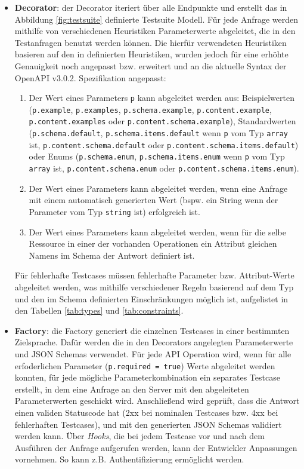 \begin{itemize}
	\item \textbf{Decorator}: der Decorator iteriert über alle Endpunkte und erstellt das in Abbildung \ref{fig:testsuite} definierte Testsuite Modell. Für jede Anfrage werden mithilfe von verschiedenen Heuristiken Parameterwerte abgeleitet, die in den Testanfragen benutzt werden können. Die hierfür verwendeten Heuristiken basieren auf den in \textcite{ed2018automatic} definierten Heuristiken, wurden jedoch für eine erhöhte Genauigkeit noch angepasst bzw. erweitert und an die aktuelle Syntax der OpenAPI v3.0.2. Spezifikation angepasst: 
	\begin{enumerate}
		\item Der Wert eines Parameters \lstinline|p| kann abgeleitet werden aus: Beispielwerten (\lstinline|p.example|, \lstinline|p.examples|, \lstinline|p.schema.example|, \lstinline|p.content.example|, \lstinline|p.content.examples| oder \lstinline|p.content.schema.example|), Standardwerten (\lstinline|p.schema.default|, \lstinline|p.schema.items.default| wenn \lstinline|p| vom Typ \lstinline|array| ist, \lstinline|p.content.schema.default| oder \lstinline|p.content.schema.items.default|) oder Enums (\lstinline|p.schema.enum|,  \lstinline|p.schema.items.enum| wenn \lstinline|p| vom Typ \lstinline|array| ist, \lstinline|p.content.schema.enum| oder \lstinline|p.content.schema.items.enum|).
		\item Der Wert eines Parameters kann abgeleitet werden, wenn eine Anfrage mit einem automatisch generierten Wert (bspw. ein String wenn der Parameter vom Typ \lstinline|string| ist) erfolgreich ist.
		\item Der Wert eines Parameters kann abgeleitet werden, wenn für die selbe Ressource in einer der vorhanden Operationen ein Attribut gleichen Namens im Schema der Antwort definiert ist.
	\end{enumerate}
	Für fehlerhafte Testcases müssen fehlerhafte Parameter bzw. Attribut-Werte abgeleitet werden, was mithilfe verschiedener Regeln basierend auf dem Typ und den im Schema definierten Einschränkungen möglich ist, aufgelistet in den Tabellen \ref{tab:types} und \ref{tab:constraints}. 
	\item \textbf{Factory}: die Factory generiert die einzelnen Testcases in einer bestimmten Zielsprache. Dafür werden die in den Decorators angelegten Parameterwerte und JSON Schemas verwendet. Für jede API Operation wird, wenn für alle erfoderlichen Parameter (\lstinline|p.required = true|) Werte abgeleitet werden konnten,  für jede mögliche Parameterkombination ein separates Testcase erstellt, in dem eine Anfrage an den Server mit den abgeleiteten Parameterwerten geschickt wird. Anschließend wird geprüft, dass die Antwort einen validen Statuscode hat (2xx bei nominalen Testcases bzw. 4xx bei fehlerhaften Testcases), und mit den generierten JSON Schemas validiert werden kann. Über \emph{Hooks}, die bei jedem Testcase vor und nach dem Ausführen der Anfrage aufgerufen werden, kann der Entwickler Anpassungen vornehmen. So kann z.B. Authentifizierung ermöglicht werden. 
\end{itemize}

